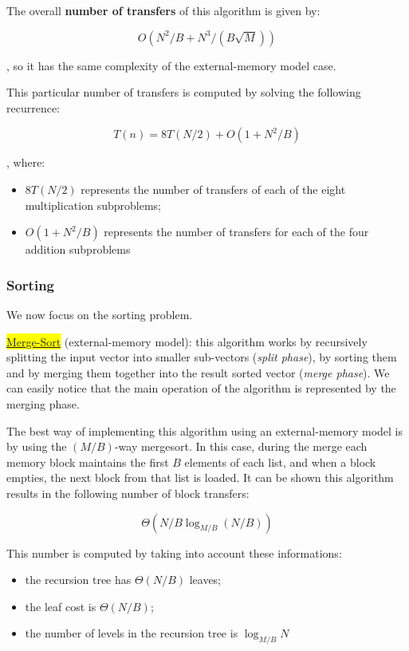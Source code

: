 The overall \textbf{number of transfers} of this algorithm is given by:

$$
O(N^2/B + N^3/(B \sqrt{M}))
$$

, so it has the same complexity of the external-memory model case.

This particular number of transfers is computed by solving the following recurrence:

$$
T(n) = 8T(N/2) + O(1 + N^2/B)
$$

, where:

\begin{itemize}
    \item $8T(N/2)$ represents the number of transfers of each of the eight multiplication subproblems;
    \item $O(1 + N^2/B)$ represents the number of transfers for each of the four addition subproblems
\end{itemize}


\subsubsection{Sorting} 
We now focus on the sorting problem.

\colorbox{yellow}{\underline{Merge-Sort}} (external-memory model): this algorithm works by recursively splitting the input vector into smaller sub-vectors (\textit{split phase}), by sorting them and by merging them together into the result sorted vector (\textit{merge phase}). We can easily notice that the main operation of the algorithm is represented by the merging phase. 

The best way of implementing this algorithm using an external-memory model is by using the $(M/B)$-way mergesort. In this case, during the merge each memory block maintains the first $B$ elements of each list, and when a block empties, the next block from that list is loaded. It can be shown this algorithm results in the following number of block transfers:

$$
\Theta(N/B \log_{M/B}(N/B))
$$

This number is computed by taking into account these informations:

\begin{itemize}
    \item the recursion tree has $\Theta(N/B)$ leaves;
    \item the leaf cost is $\Theta(N/B)$;
    \item the number of levels in the recursion tree is $\log_{M/B}N$
\end{itemize}

